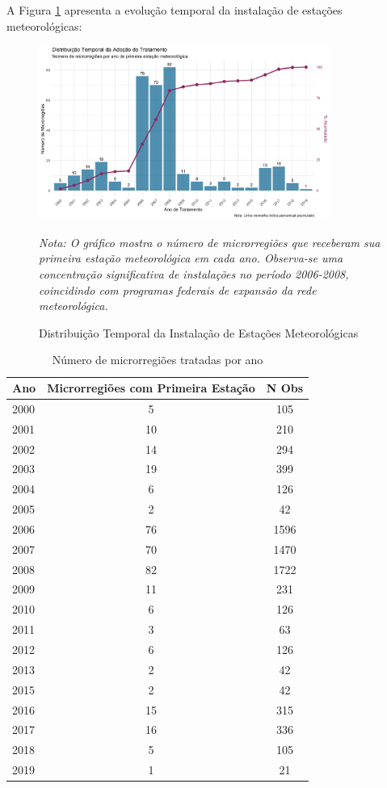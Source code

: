 \documentclass[
	12pt,				%
	oneside,			%
	a4paper,			%
	english,			%
	french,				%
	spanish,			%
	brazil				%
	]{abntex2}
\begin{document}
\begin{apendicesenv}
A Figura \ref{fig:dist_temporal} apresenta a evolução temporal da instalação de estações meteorológicas:

\begin{figure}[h]
\centering
\caption{Distribuição Temporal da Instalação de Estações Meteorológicas}
\label{fig:dist_temporal}
\includegraphics[width=0.85\textwidth]{../../../data/outputs/descriptive_analysis/distribuicao_temporal_tratamento.png}

\textit{Nota: O gráfico mostra o número de microrregiões que receberam sua primeira estação meteorológica em cada ano. Observa-se uma concentração significativa de instalações no período 2006-2008, coincidindo com programas federais de expansão da rede meteorológica.}
\end{figure}

\begin{table}[h]
\centering
\caption{Número de microrregiões tratadas por ano}
\label{tab:tratamento_temporal}
\begin{tabular}{lcc}
\toprule
Ano & Microrregiões com Primeira Estação & N Obs \\
\midrule
2000 & 5 & 105 \\
2001 & 10 & 210 \\
2002 & 14 & 294 \\
2003 & 19 & 399 \\
2004 & 6 & 126 \\
2005 & 2 & 42 \\
2006 & 76 & 1596 \\
2007 & 70 & 1470 \\
2008 & 82 & 1722 \\
2009 & 11 & 231 \\
2010 & 6 & 126 \\
2011 & 3 & 63 \\
2012 & 6 & 126 \\
2013 & 2 & 42 \\
2015 & 2 & 42 \\
2016 & 15 & 315 \\
2017 & 16 & 336 \\
2018 & 5 & 105 \\
2019 & 1 & 21 \\
\bottomrule
\end{tabular}
\end{table}


\end{apendicesenv}
\end{document}
